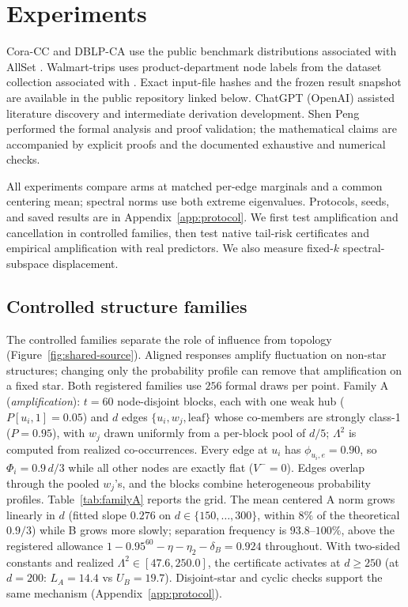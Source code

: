 \documentclass[preprint,11pt]{elsarticle}
\let\paragraph\elsparagraph
\begin{document}
\section{Experiments}\label{sec:exp}

\paragraph{Data sources and research workflow.}
Cora-CC and DBLP-CA use the public benchmark distributions associated
with AllSet \cite{chien2022allset}. Walmart-trips uses product-department
node labels from the dataset collection associated with
\cite{amburg2020categorical}. Exact input-file hashes and the frozen
result snapshot are available in the public repository linked below.
ChatGPT (OpenAI) assisted literature discovery and intermediate
derivation development. Shen Peng performed the formal analysis and
proof validation; the mathematical claims are accompanied by explicit
proofs and the documented exhaustive and numerical checks.

All experiments compare arms at matched per-edge marginals and a
common centering mean; spectral norms use both extreme eigenvalues.
Protocols, seeds, and saved results are in
Appendix~\ref{app:protocol}. We first test amplification and
cancellation in controlled families, then test native tail-risk
certificates and empirical amplification with real predictors. We
also measure fixed-$k$ spectral-subspace displacement.

\subsection{Controlled structure families}\label{sec:families}

The controlled families separate the role of influence from topology
(Figure~\ref{fig:shared-source}). Aligned responses amplify fluctuation
on non-star structures; changing only the probability profile can
remove that amplification on a fixed star. Both registered families
use $256$ formal draws per point. Family A
(\emph{amplification}): $t=60$ node-disjoint blocks, each with one weak
hub ($P[u_i,1]=0.05$) and $d$ edges $\{u_i,w_j,\text{leaf}\}$ whose
co-members are strongly class-1 ($P=0.95$), with $w_j$ drawn uniformly
from a per-block pool of $d/5$; $\Lambda^2$ is computed from realized
co-occurrences. Every edge
at $u_i$ has $\phi_{u_i,e}=0.90$, so $\Phi_i=0.9\,d/3$ while all other
nodes are exactly flat ($V^-=0$). Edges overlap through the pooled
$w_j$'s, and the blocks combine heterogeneous probability profiles.
Table~\ref{tab:familyA} reports the grid. The mean centered A norm
grows linearly in $d$ (fitted slope $0.276$ on $d\in\{150,\dots,300\}$,
within $8\%$ of the theoretical $0.9/3$) while B grows more slowly;
separation frequency is $93.8$--$100\%$, above the registered
allowance $1-0.95^{60}-\eta-\eta_2-\delta_B=0.924$ throughout. With
two-sided constants and realized $\Lambda^2\in[47.6,250.0]$, the
certificate activates at $d\ge250$ (at $d=200$: $L_A=14.4$ vs
$U_B=19.7$). Disjoint-star and cyclic checks support the same
mechanism (Appendix~\ref{app:protocol}).
\end{document}
